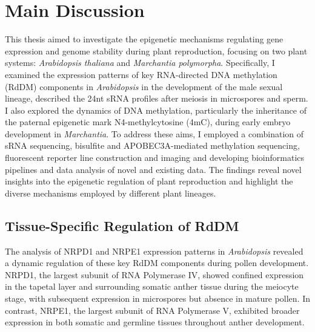 \chapter{Main Discussion}

\ifpdf
    \graphicspath{{Chapter4/Figs/}}
\else
    \graphicspath{{Chapter3/Figs/}}
\fi


This thesis aimed to investigate the epigenetic mechanisms regulating gene expression and genome stability during plant reproduction, focusing on two plant systems: \textit{Arabidopsis thaliana} and \textit{Marchantia polymorpha}. Specifically, I examined the expression patterns of key RNA-directed DNA methylation (RdDM) components in \textit{Arabidopsis} in the development of the male sexual lineage, described the 24nt sRNA profiles after meiosis in microspores and sperm. I also explored the dynamics of DNA methylation, particularly the inheritance of the paternal epigenetic mark N4-methylcytosine (4mC), during early embryo development in \textit{Marchantia}. To address these aims, I employed a combination of sRNA sequencing, bisulfite and APOBEC3A-mediated methylation sequencing,  fluorescent reporter line construction and imaging and developing bioinformatics pipelines and data analysis of novel and existing data. The findings reveal novel insights into the epigenetic regulation of plant reproduction and highlight the diverse mechanisms employed by different plant lineages.

\section{Tissue-Specific Regulation of RdDM}

The analysis of NRPD1 and NRPE1 expression patterns in \textit{Arabidopsis} revealed a dynamic regulation of these key RdDM components during pollen development. NRPD1, the largest subunit of RNA Polymerase IV, showed confined expression in the tapetal layer and surrounding somatic anther tissue during the meiocyte stage, with subsequent expression in microspores but absence in mature pollen. In contrast, NRPE1, the largest subunit of RNA Polymerase V, exhibited broader expression in both somatic and germline tissues throughout anther development. 

